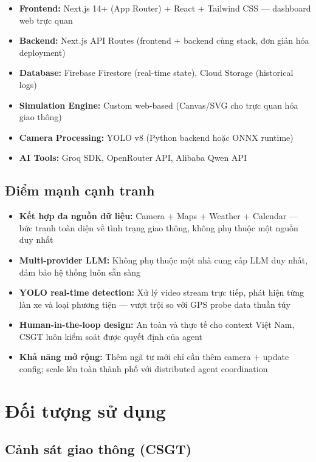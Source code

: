 \documentclass[12pt,a4paper]{article}
\begin{document}
\begin{itemize}
    \item \textbf{Frontend:} Next.js 14+ (App Router) + React + Tailwind CSS — dashboard web trực quan
    \item \textbf{Backend:} Next.js API Routes (frontend + backend cùng stack, đơn giản hóa deployment)
    \item \textbf{Database:} Firebase Firestore (real-time state), Cloud Storage (historical logs)
    \item \textbf{Simulation Engine:} Custom web-based (Canvas/SVG cho trực quan hóa giao thông)
    \item \textbf{Camera Processing:} YOLO v8 (Python backend hoặc ONNX runtime)
    \item \textbf{AI Tools:} Groq SDK, OpenRouter API, Alibaba Qwen API
\end{itemize}

\subsection{Điểm mạnh cạnh tranh}

\begin{itemize}
    \item \textbf{Kết hợp đa nguồn dữ liệu:} Camera + Maps + Weather + Calendar — bức tranh toàn diện về tình trạng giao thông, không phụ thuộc một nguồn duy nhất
    \item \textbf{Multi-provider LLM:} Không phụ thuộc một nhà cung cấp LLM duy nhất, đảm bảo hệ thống luôn sẵn sàng
    \item \textbf{YOLO real-time detection:} Xử lý video stream trực tiếp, phát hiện từng làn xe và loại phương tiện — vượt trội so với GPS probe data thuần túy
    \item \textbf{Human-in-the-loop design:} An toàn và thực tế cho context Việt Nam, CSGT luôn kiểm soát được quyết định của agent
    \item \textbf{Khả năng mở rộng:} Thêm ngã tư mới chỉ cần thêm camera + update config; scale lên toàn thành phố với distributed agent coordination
\end{itemize}

\section{Đối tượng sử dụng}

\subsection{Cảnh sát giao thông (CSGT)}
\end{document}
